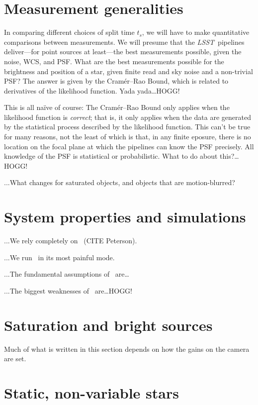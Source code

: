 \documentclass[12pt]{article}
\newcommand{\project}[1]{\textsl{#1}}
\newcommand{\LSST}{\project{LSST}}
\begin{document}
\section{Measurement generalities}

In comparing different choices of split time $t_s$, we will have to make
quantitative comparisons between measurements.
We will presume that the \LSST\ pipelines deliver---for point sources at
least---the best measurements possible, given the noise, WCS, and PSF.
What are the best measurements possible for the brightness and position
of a star, given finite read and sky noise and a non-trivial PSF?
The answer is given by the Cram\'er--Rao Bound, which is related to
derivatives of the likelihood function.
Yada yada\ldots HOGG!

This is all na\"ive of course:
The Cram\'er--Rao Bound only applies when the likelihood function is
\emph{correct}; that is, it only applies when the data are generated by
the statistical process described by the likelihood function.
This can't be true for many reasons, not the least of which is that,
in any finite eposure, there is no location on the focal plane at which
the pipelines can know the PSF precisely.
All knowledge of the PSF is statistical or probabilistic.
What to do about this?\ldots HOGG!

...What changes for saturated objects, and objects that are motion-blurred?

\section{System properties and simulations}

...We rely completely on \ImSim\ (CITE Peterson).

...We run \ImSim\ in its most painful mode.

...The fundamental assumptions of \ImSim\ are\ldots

...The biggest weaknesses of \ImSim\ are\ldots HOGG!

\section{Saturation and bright sources}

Much of what is written in this section depends on how the gains on the
camera are set.

\section{Static, non-variable stars}
\end{document}
